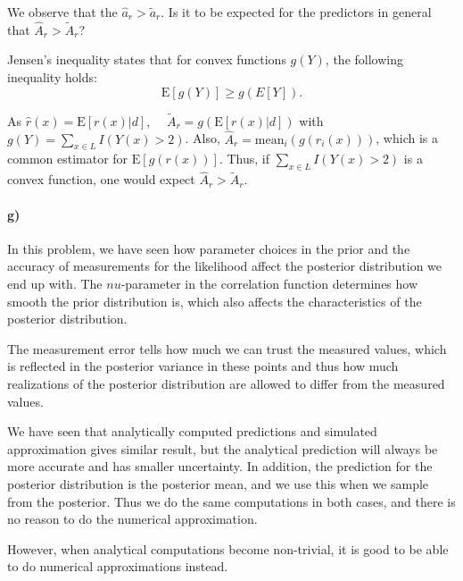 We observe that the $\hat{a}_r > \tilde{a}_r$. 
Is it to be expected for the predictors in general that $\hat{A}_r > \tilde{A}_r$? 

Jensen's inequality states that for convex functions $g(Y)$, the following inequality holds: 
\begin{equation*}
    \text{E}[g(Y)] \geq g(E[Y]).
\end{equation*}

As $\hat{r}(x) = \text{E}[r(x)|d]$, $\quad \tilde{A}_r = g(\text{E}[r(x)|d])$ with $g(Y) = \sum_{x \in L} I(Y(x)>2)$. Also, $\hat{A}_r = \text{mean}_i(g(r_i(x)))$, which is a common estimator for $\text{E}[g(r(x))]$.
Thus, if $\sum_{x \in L} I(Y(x)>2)$ is a convex function, one would expect $\hat{A}_r > \tilde{A}_r$.
\paragraph{g)}
In this problem, we have seen how parameter choices in the prior and the accuracy of measurements for the likelihood affect the posterior distribution we end up with. The $nu$-parameter in the correlation function determines how smooth the prior distribution is, which also affects the characteristics of the posterior distribution. 

The measurement error tells how much we can trust the measured values, which is reflected in the posterior variance in these points and thus how much realizations of the posterior distribution are allowed to differ from the measured values.

We have seen that analytically computed predictions and simulated approximation gives similar result, but the analytical prediction will always be more accurate and has smaller uncertainty. In addition, the prediction for the posterior distribution is the posterior mean, and we use this when we sample from the posterior. Thus we do the same computations in both cases, and there is no reason to do the numerical approximation. 

However, when analytical computations become non-trivial, it is good to be able to do numerical approximations instead.

